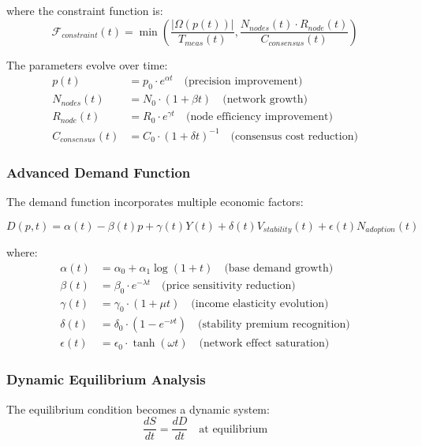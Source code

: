 \documentclass[12pt,a4paper]{article}
\begin{document}
where the constraint function is:
\begin{equation}
\mathcal{F}_{constraint}(t) = \min\left(\frac{|\Omega(p(t))|}{T_{meas}(t)}, \frac{N_{nodes}(t) \cdot R_{node}(t)}{C_{consensus}(t)}\right)
\end{equation}

The parameters evolve over time:
\begin{align}
p(t) &= p_0 \cdot e^{\alpha t} \quad \text{(precision improvement)} \\
N_{nodes}(t) &= N_0 \cdot (1 + \beta t) \quad \text{(network growth)} \\
R_{node}(t) &= R_0 \cdot e^{\gamma t} \quad \text{(node efficiency improvement)} \\
C_{consensus}(t) &= C_0 \cdot (1 + \delta t)^{-1} \quad \text{(consensus cost reduction)}
\end{align}

\subsubsection{Advanced Demand Function}

The demand function incorporates multiple economic factors:

\begin{equation}
D(p,t) = \alpha(t) - \beta(t) p + \gamma(t) Y(t) + \delta(t) V_{stability}(t) + \epsilon(t) N_{adoption}(t)
\end{equation}

where:
\begin{align}
\alpha(t) &= \alpha_0 + \alpha_1 \log(1 + t) \quad \text{(base demand growth)} \\
\beta(t) &= \beta_0 \cdot e^{-\lambda t} \quad \text{(price sensitivity reduction)} \\
\gamma(t) &= \gamma_0 \cdot (1 + \mu t) \quad \text{(income elasticity evolution)} \\
\delta(t) &= \delta_0 \cdot (1 - e^{-\nu t}) \quad \text{(stability premium recognition)} \\
\epsilon(t) &= \epsilon_0 \cdot \tanh(\omega t) \quad \text{(network effect saturation)}
\end{align}

\subsubsection{Dynamic Equilibrium Analysis}

The equilibrium condition becomes a dynamic system:
\begin{equation}
\frac{dS}{dt} = \frac{dD}{dt} \quad \text{at equilibrium}
\end{equation}
\end{document}
